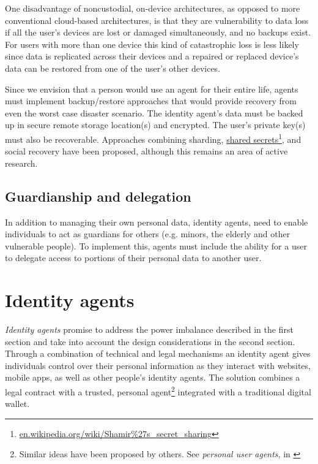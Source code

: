 \documentclass[11pt, oneside]{article}   	%
\newcommand{\hyperfootnote}[1][]{\def\ArgI{{#1}}\hyperfootnoteRelay}
\newcommand\hyperfootnoteRelay[2][]{\href{#1#2}{\ArgI}\footnote{\href{#1#2}{#2}}}
\begin{document}
One disadvantage of noncustodial, on-device architectures, as opposed to more conventional cloud-based architectures, is that they are vulnerability to data loss if all the user's devices are lost or damaged simultaneously, and no backups exist. For users with more than one device this kind of catastrophic loss is less likely since data is replicated across their devices and a repaired or replaced device's data can be restored from one of the user's other devices. 

Since we envision that a person would use an agent for their entire life, agents must implement backup/restore approaches that would provide recovery from even the worst case disaster scenario. The identity agent's data must be backed up in secure remote storage location(s) and encrypted. The user's private key(s) must also be recoverable. Approaches combining sharding, \hyperfootnote[shared secrets][https://]{en.wikipedia.org/wiki/Shamir\%27s\_secret\_sharing}, and social recovery have been proposed, although this remains an area of active research. 

\subsection{Guardianship and delegation}

In addition to managing their own personal data, identity agents, need to enable individuals to act as guardians for others (e.g. minors, the elderly and other vulnerable people). To implement this, agents must include the ability for a user to delegate access to portions of their personal data to another user.

\section{Identity agents} %

 \emph{Identity agents} promise to address the power imbalance described in the first section and take into account the design considerations in the second section. Through a combination of technical and legal mechanisms an identity agent gives individuals control over their personal information as they interact with websites, mobile apps, as well as other people's identity agents. The solution combines a legal contract with a trusted, personal agent\footnote{Similar ideas have been proposed by others. See \emph{personal user agents}, in \cite[p24]{Flanagan2020}} integrated with a traditional digital wallet\cite{Graham2023}.
\end{document}
